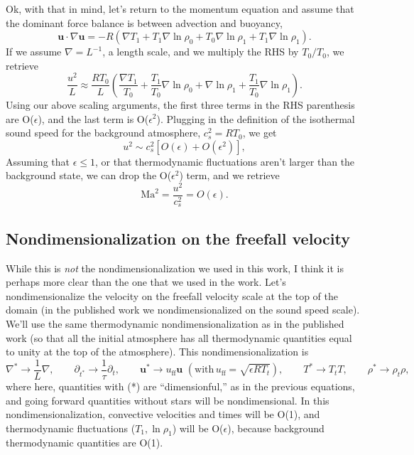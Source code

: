 \documentclass[aps, pre, onecolumn, nofootinbib, notitlepage, groupedaddress, amsfonts, amssymb, amsmath, longbibliography, superscriptaddress]{revtex4-1}
\newcommand{\grad}{\ensuremath{\nabla}}
\begin{document}
Ok, with that in mind, let's return to the momentum equation and assume that the dominant force balance is between advection and buoyancy,
$$
\bm{u}\cdot\grad\bm{u} = - R(\grad T_1 + T_1 \grad\ln\rho_0 + T_0 \grad\ln\rho_1 + T_1 \grad\ln\rho_1).
$$
If we assume $\grad = L^{-1}$, a length scale, and we multiply the RHS by $T_0 / T_0$, we retrieve
$$
\frac{u^2}{L} \approx \frac{R T_0}{L}\left(\frac{\grad T_1}{T_0} + \frac{T_1}{T_0}\grad\ln\rho_0 + \grad\ln\rho_1 + \frac{T_1}{T_0}\grad\ln\rho_1 \right).
$$
Using our above scaling arguments, the first three terms in the RHS parenthesis are O($\epsilon$), and the last term is O($\epsilon^2$).
Plugging in the definition of the isothermal sound speed for the background atmosphere, $c_s^2 = R T_0$, we get
$$
u^2 \sim c_s^2 [ O(\epsilon) + O(\epsilon^2) ],
$$
Assuming that $\epsilon \leq 1$, or that thermodynamic fluctuations aren't larger than the background state, we can drop the O($\epsilon^2$) term, and we retrieve
$$
\text{Ma}^2 = \frac{u^2}{c_s^2} = O(\epsilon).
$$


\subsection{Nondimensionalization on the freefall velocity}
While this is \emph{not} the nondimensionalization we used in this work, I think it is perhaps more clear than the one that we used in the work.
Let's nondimensionalize the velocity on the freefall velocity scale at the top of the domain (in the published work we nondimensionalized on the sound speed scale).
We'll use the same thermodynamic nondimensionalization as in the published work (so that all the initial atmosphere has all thermodynamic quantities equal to unity at the top of the atmosphere).
This nondimensionalization is
$$
\grad^* \rightarrow \frac{1}{L}\grad,\qquad
\partial_{t^*} \rightarrow \frac{1}{\tau}\partial_t, \qquad
\bm{u}^* \rightarrow u_{\text{ff}}\bm{u}\,\,(\text{with}\, u_{\text{ff}} = \sqrt{\epsilon R T_t}), \qquad
T^* \rightarrow T_t T,\qquad
\rho^* \rightarrow \rho_t \rho,
$$
where here, quantities with (*) are ``dimensionful,'' as in the previous equations, and going forward quantities without stars will be nondimensional.
In this nondimensionalization, convective velocities and times will be O(1), and thermodynamic fluctuations ($T_1, \ln\rho_1$) will be O($\epsilon$), because background thermodynamic quantities are O(1).
\end{document}
